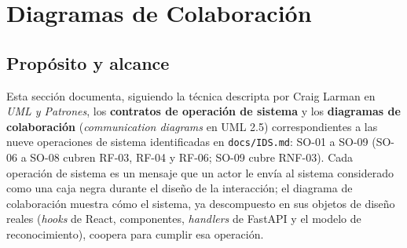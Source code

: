 \section{Diagramas de Colaboración}

\subsection{Propósito y alcance}

Esta sección documenta, siguiendo la técnica descripta por Craig Larman en
\textit{UML y Patrones}, los \textbf{contratos de operación de sistema} y los
\textbf{diagramas de colaboración} (\textit{communication diagrams} en UML
2.5) correspondientes a las nueve operaciones de sistema identificadas en
\texttt{docs/IDS.md}: SO-01 a SO-09 (SO-06 a SO-08 cubren RF-03, RF-04 y
RF-06; SO-09 cubre RNF-03). Cada operación de sistema es un mensaje
que un actor le envía al sistema considerado como una caja negra durante el
diseño de la interacción; el diagrama de colaboración muestra cómo el
sistema, ya descompuesto en sus objetos de diseño reales (\textit{hooks} de
React, componentes, \textit{handlers} de FastAPI y el modelo de
reconocimiento), coopera para cumplir esa operación.

